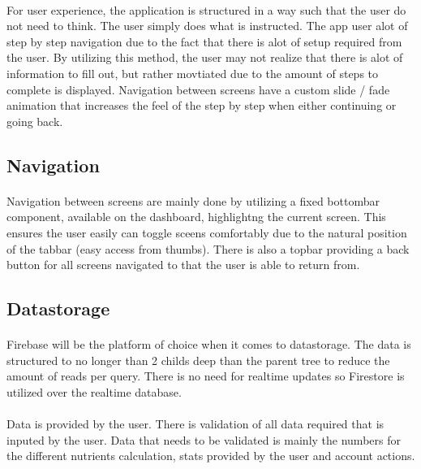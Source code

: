 \documentclass{article}
\begin{document}
\paragraph{}
    For user experience, the application is structured in a way such that the user do not need to think. The user simply does what is instructed. The app 
    user alot of step by step navigation due to the fact that there is alot of setup required from the user. By utilizing this method, the user may not 
    realize that there is alot of information to fill out, but rather movtiated due to the amount of steps to complete is displayed. Navigation between 
    screens have a custom slide / fade animation that increases the feel of the step by step when either continuing or going back.
    
    \hfill \break

\subsection{Navigation}
    \paragraph{}
    Navigation between screens are mainly done by utilizing a fixed bottombar component, available on the dashboard, highlightng the current
    screen. This ensures the user easily can toggle sceens comfortably due to the natural position of the tabbar (easy access from thumbs). 
    There is also a topbar providing a back button for all screens navigated to that the user is able to return from.

    \hfill \break

\subsection{Datastorage}
    \paragraph{}
    Firebase will be the platform of choice when it comes to datastorage. The data is structured to no longer than 2 childs deep than the parent tree to reduce the amount of reads per query.
    There is no need for realtime updates so Firestore is utilized over the realtime database.

    \paragraph{}
    Data is provided by the user. There is validation of all data required that is inputed by the user.
    Data that needs to be validated is mainly the numbers for the different nutrients calculation, stats provided by the user and account actions.
\end{document}
